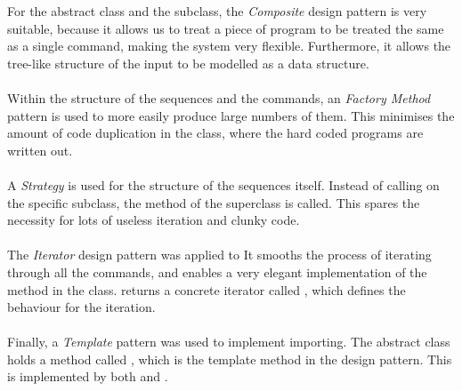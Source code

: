 For the  abstract class and the  subclass, the \textit{Composite} design pattern is very suitable, because it allows us to treat a piece of program to be treated the same as a single command, making the system very flexible. Furthermore, it allows the tree-like structure of the input to be modelled as a data structure. \\~\\

Within the structure of the sequences and the commands, an \textit{Factory Method} pattern is used to more easily produce large numbers of them. This minimises the amount of code duplication in the  class, where the hard coded programs are written out.\\~\\

A \textit{Strategy} is used for the structure of the sequences itself. Instead of calling on the specific subclass, the  method of the superclass is called. This spares the necessity for lots of useless iteration and clunky code. \\~\\

The \textit{Iterator} design pattern was applied to It smooths the process of iterating through all the commands, and enables a very elegant implementation of the  method in the  class.  returns a concrete iterator called , which defines the behaviour for the iteration. \\~\\

Finally, a \textit{Template} pattern was used to implement importing. The  abstract class holds a method called , which is the template method in the design pattern. This is implemented by both  and . 